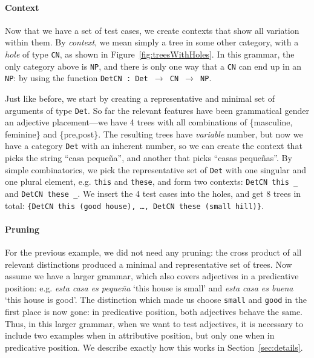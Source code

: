 \documentclass[11pt]{article}
\def\t#1{\texttt{#1}}
\begin{document}
\paragraph{Context} 

Now that we have a set of test cases, we create contexts that show all
variation within them. By \emph{context}, we mean simply a tree in
some other category, with a \emph{hole} of type \t{CN}, as shown in
Figure~\ref{fig:treesWithHoles}. 
In this grammar, the only category above is \t{NP}, and there is only
one way that a \t{CN} can end up in an \t{NP}: by using the function
\t{DetCN : Det $\rightarrow$ CN $\rightarrow$ NP}. 

Just like before, we start by creating a representative and minimal
set of arguments of type \t{Det}. So far the relevant features have
been grammatical gender an adjective placement---we have 4 trees with
all combinations of \{masculine, feminine\} and \{pre,post\}. The
resulting trees have \emph{variable} number, but now we have a
category \t{Det} with an inherent number, so we can create the context
that picks the string ``casa  peque\~{n}a'', and another that picks
``casas  peque\~{n}as''. By simple combinatorics, we pick the
representative set of \t{Det} with one singular and one plural
element, e.g. \t{this} and \t{these}, and form two contexts:
\verb|DetCN this _| and  \verb|DetCN these _|. We insert the 4 test
cases into the holes, and get 8 trees in total: \t{\{DetCN this (good
  house), \dots, DetCN these (small hill)\}}. 


\paragraph{Pruning}

For the previous example, we did not need any pruning: the cross
product of all relevant distinctions produced a minimal and
representative set of trees. Now assume we have a larger grammar,
which also covers adjectives in a predicative position:
e.g. \emph{esta casa es peque\~{n}a} `this house is small' and
\emph{esta casa es buena} `this house is good'. The distinction which
made us choose \t{small} and \t{good} in the first place is now gone:
in predicative position, both adjectives behave the same. Thus, in
this larger grammar, when we want to test adjectives, it is necessary
to include two examples when in attributive position, but only one
when in predicative position. We describe exactly how this works in
Section~\ref{sec:details}. 
\end{document}
